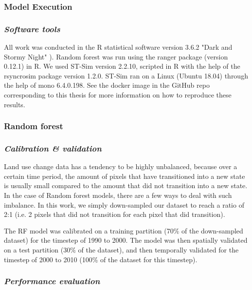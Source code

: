 \subsubsection{Model Execution}

\subsubsection*{\textit{Software tools}}
All work was conducted in the R statistical software version 3.6.2 "Dark and Stormy Night" \citep[see][]{R}). Random forest was run using the ranger package (version 0.12.1) in R. We used ST-Sim version 2.2.10, scripted in R with the help of the rsyncrosim package version 1.2.0. ST-Sim ran on a Linux (Ubuntu 18.04) through the help of mono 6.4.0.198. See the docker image in the GitHub repo corresponding to this thesis for more information on how to reproduce these results. \\

\subsubsection{Random forest}

\subsubsection*{\textit{Calibration \& validation}}

Land use change data has a tendency to be highly unbalanced, because over a certain time period, the amount of pixels that have transitioned into a new state is usually small compared to the amount that did not transition into a new state. In the case of Random forest models, there are a few ways to deal with such imbalance. In this work, we simply down-sampled our dataset to reach a ratio of 2:1 (i.e. 2 pixels that did not transition for each pixel that did transition). 

The RF model was calibrated on a training partition (70\% of the down-sampled dataset) for the timestep of 1990 to 2000. The model was then spatially validated on a test partition (30\% of the dataset), and then temporally validated for the timestep of 2000 to 2010 (100\% of the dataset for this timestep). \\

\subsubsection*{\textit{Performance evaluation}}

